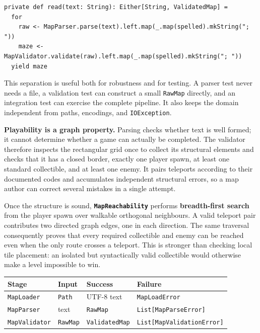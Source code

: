 \begin{lstlisting}
private def read(text: String): Either[String, ValidatedMap] =
  for
    raw <- MapParser.parse(text).left.map(_.map(spelled).mkString("; "))
    maze <- MapValidator.validate(raw).left.map(_.map(spelled).mkString("; "))
  yield maze
\end{lstlisting}

This separation is useful both for robustness and for testing. A parser test never needs a file, a validation test can
construct a small \texttt{RawMap} directly, and an integration test can exercise the complete pipeline. It also keeps
the domain independent from paths, encodings, and \texttt{IOException}.

\textbf{Playability is a graph property.} Parsing checks whether text is well formed; it cannot determine whether a game can actually be completed. The
validator therefore inspects the rectangular grid once to collect its structural elements and checks that it has a
closed border, exactly one player spawn, at least one standard collectible, and at least one enemy. It pairs
teleports according to their documented codes and accumulates independent structural errors, so a map author can
correct several mistakes in a single attempt.

Once the structure is sound, \textbf{\texttt{MapReachability}} performs \textbf{breadth-first search} from the player spawn over
walkable orthogonal neighbours. A valid teleport pair contributes two directed graph edges, one in each direction.
The same traversal consequently proves that every required collectible and enemy can be reached even when the only
route crosses a teleport. This is stronger than checking local tile placement: an isolated but syntactically valid
collectible would otherwise make a level impossible to win.

\begin{center}
  \small
  \begin{tabular}{|p{2.3cm}|p{3.1cm}|p{3.2cm}|p{3.2cm}|}
    \hline
    \textbf{Stage} & \textbf{Input} & \textbf{Success} & \textbf{Failure} \\
    \hline
    \texttt{MapLoader} & \texttt{Path} & UTF-8 text & \texttt{MapLoadError} \\
    \hline
    \texttt{MapParser} & text & \texttt{RawMap} & \texttt{List[MapParseError]} \\
    \hline
    \texttt{MapValidator} & \texttt{RawMap} & \texttt{ValidatedMap} & \texttt{List[MapValidationError]} \\
    \hline
  \end{tabular}
\end{center}

